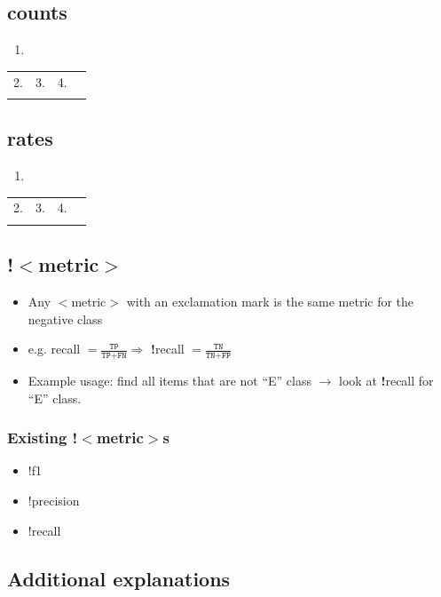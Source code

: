 \documentclass[12pt,a4paper]{article}
\begin{document}
\subsection{counts}
\begin{enumerate}
\item %
\end{enumerate}
\begin{tabular}{|l|l|l|l|}
\hline
2. & 3. & 4.\\ 
 & & \\ \hline
\end{tabular}
%
\subsection{rates}
\begin{enumerate}
\item %
\end{enumerate}
\begin{tabular}{|l|l|l|l|}
\hline
2. & 3. & 4.\\ 
 & & \\ \hline
\end{tabular}
%
\subsection{!$<$metric$>$}
\begin{itemize}
\item Any $<$metric$>$ with an exclamation mark is the same metric for the negative class
\item e.g. recall $= \frac{\texttt{TP}}{\texttt{TP} + \texttt{FN}} \Rightarrow$ \textbf{!}recall  $= \frac{\texttt{TN}}{\texttt{TN} + \texttt{FP}}$
\item Example usage: find all items that are not ``E'' class $\rightarrow$ look at \textbf{!}recall for ``E'' class.
\end{itemize}
\subsubsection{Existing !$<$metric$>$s}
\begin{itemize}
\item !f1
\item !precision
\item !recall
\end{itemize}
%
\subsection{Additional explanations}
\end{document}
